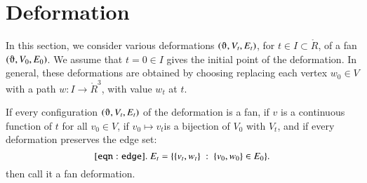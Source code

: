 %
%
%
%
%
%

\section{Deformation}

In this section, we consider various deformations $(\orgn,V_t,E_t)$,
for $t\in I\subset \ring{R}$, of
a fan $(\orgn,V_0,E_0)$.  
We assume that $t=0\in I$ gives the initial point
of the deformation.  
In general, these deformations
are obtained by choosing replacing each vertex $w_0\in V$
with a path $w:I\to \ring{R}^3$, with value $w_t$ at $t$.

\begin{definition}
If every configuration $(\orgn,V_t,E_t)$ of the 
deformation is a fan,
if $v$ is a continuous function of $t$ for all $v_0\in V$,
if $v_0\mapsto v_t$is a bijection of $V_0$ with $V_t$, 
and if
 every deformation
preserves the edge set:
   \begin{equation}\tlabel{eqn:edge}
   E_t = \{ \{v_t,w_t\} \mid \{v_0,w_0\}\in E_0\}.
   \end{equation}
then call it a
fan deformation.
\end{definition}

